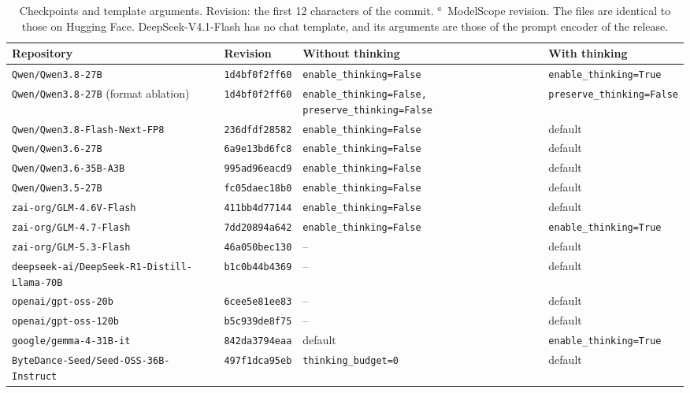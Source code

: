 \begin{table}[htbp]
\centering
\caption{Checkpoints and template arguments. Revision: the first 12 characters of the commit. $^{a}$~ModelScope revision. The files are identical to those on Hugging Face. DeepSeek-V4.1-Flash has no chat template, and its arguments are those of the prompt encoder of the release.}
\label{tab:self_config}
\scriptsize
\setlength{\tabcolsep}{2.5pt}
\begin{tabular}{llp{3.2cm}p{3.5cm}}
\toprule
Repository & Revision & Without thinking & With thinking \\
\midrule
\texttt{Qwen/Qwen3.8-27B} & \texttt{1d4bf0f2ff60} & \texttt{enable\_thinking=False} & \texttt{enable\_thinking=True} \\
\texttt{Qwen/Qwen3.8-27B} (format ablation) & \texttt{1d4bf0f2ff60} & \texttt{enable\_thinking=\allowbreak False, preserve\_thinking=\allowbreak False} & \texttt{preserve\_thinking=False} \\
\texttt{Qwen/Qwen3.8-Flash-Next-FP8} & \texttt{236dfdf28582} & \texttt{enable\_thinking=False} & default \\
\texttt{Qwen/Qwen3.6-27B} & \texttt{6a9e13bd6fc8} & \texttt{enable\_thinking=False} & default \\
\texttt{Qwen/Qwen3.6-35B-A3B} & \texttt{995ad96eacd9} & \texttt{enable\_thinking=False} & default \\
\texttt{Qwen/Qwen3.5-27B} & \texttt{fc05daec18b0} & \texttt{enable\_thinking=False} & default \\
\texttt{zai-org/GLM-4.6V-Flash} & \texttt{411bb4d77144} & \texttt{enable\_thinking=False} & default \\
\texttt{zai-org/GLM-4.7-Flash} & \texttt{7dd20894a642} & \texttt{enable\_thinking=False} & \texttt{enable\_thinking=True} \\
\texttt{zai-org/GLM-5.3-Flash} & \texttt{46a050bec130} & -- & default \\
\texttt{deepseek-ai/DeepSeek-R1-Distill-Llama-70B} & \texttt{b1c0b44b4369} & -- & default \\
\texttt{openai/gpt-oss-20b} & \texttt{6cee5e81ee83} & -- & default \\
\texttt{openai/gpt-oss-120b} & \texttt{b5c939de8f75} & -- & default \\
\texttt{google/gemma-4-31B-it} & \texttt{842da3794eaa} & default & \texttt{enable\_thinking=True} \\
\texttt{ByteDance-Seed/Seed-OSS-36B-Instruct} & \texttt{497f1dca95eb} & \texttt{thinking\_budget=0} & default \\

\end{tabular}
\end{table}
